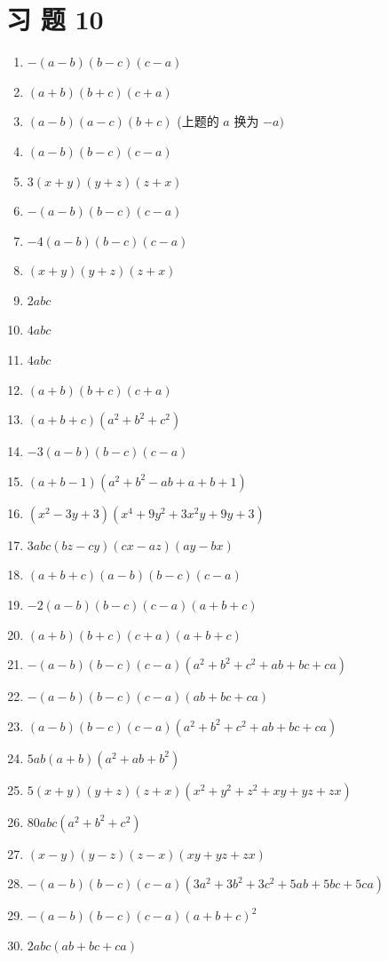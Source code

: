 \documentclass[10pt]{article}
\begin{document}
\section*{习 题 10}
\begin{enumerate}
  \item $-(a-b)(b-c)(c-a)$
  \item $(a+b)(b+c)(c+a)$
  \item $(a-b)(a-c)(b+c)$ (上题的 $a$ 换为 $-a)$
  \item $(a-b)(b-c)(c-a)$
  \item $3(x+y)(y+z)(z+x)$
  \item $-(a-b)(b-c)(c-a)$
  \item $-4(a-b)(b-c)(c-a)$
  \item $(x+y)(y+z)(z+x)$
  \item $2 a b c$
  \item $4 a b c$
  \item $4 a b c$
  \item $(a+b)(b+c)(c+a)$
  \item $(a+b+c)\left(a^{2}+b^{2}+c^{2}\right)$
  \item $-3(a-b)(b-c)(c-a)$
  \item $(a+b-1)\left(a^{2}+b^{2}-a b+a+b+1\right)$
  \item $\left(x^{2}-3 y+3\right)\left(x^{4}+9 y^{2}+3 x^{2} y+9 y+3\right)$
  \item $3 a b c(b z-c y)(c x-a z)(a y-b x)$
  \item $(a+b+c)(a-b)(b-c)(c-a)$
  \item $-2(a-b)(b-c)(c-a)(a+b+c)$
  \item $(a+b)(b+c)(c+a)(a+b+c)$
  \item $-(a-b)(b-c)(c-a)\left(a^{2}+b^{2}+c^{2}+a b+b c+c a\right)$
  \item $-(a-b)(b-c)(c-a)(a b+b c+c a)$
  \item $(a-b)(b-c)(c-a)\left(a^{2}+b^{2}+c^{2}+a b+b c+c a\right)$
  \item $5 a b(a+b)\left(a^{2}+a b+b^{2}\right)$
  \item $5(x+y)(y+z)(z+x)\left(x^{2}+y^{2}+z^{2}+x y+y z+z x\right)$
  \item $80 a b c\left(a^{2}+b^{2}+c^{2}\right)$
  \item $(x-y)(y-z)(z-x)(x y+y z+z x)$
  \item $-(a-b)(b-c)(c-a)\left(3 a^{2}+3 b^{2}+3 c^{2}+5 a b+5 b c+5 c a\right)$
  \item $-(a-b)(b-c)(c-a)(a+b+c)^{2}$
  \item $2 a b c(a b+b c+c a)$

\end{enumerate}
\end{document}
